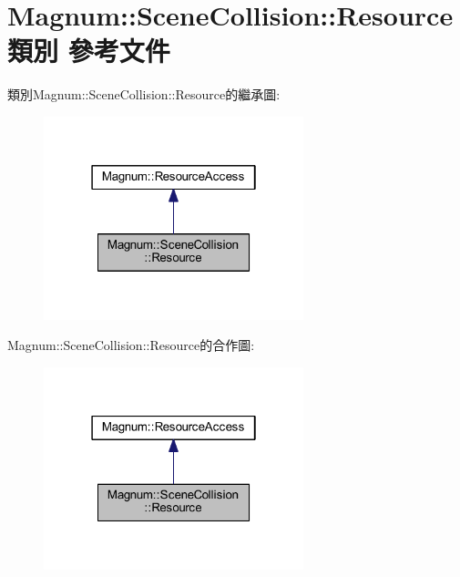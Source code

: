 \hypertarget{class_magnum_1_1_scene_collision_1_1_resource}{}\section{Magnum\+:\+:Scene\+Collision\+:\+:Resource 類別 參考文件}
\label{class_magnum_1_1_scene_collision_1_1_resource}


類別\+Magnum\+:\+:Scene\+Collision\+:\+:Resource的繼承圖\+:\nopagebreak
\begin{figure}[H]
\begin{center}
\leavevmode
\includegraphics[width=214pt]{class_magnum_1_1_scene_collision_1_1_resource__inherit__graph}
\end{center}
\end{figure}


Magnum\+:\+:Scene\+Collision\+:\+:Resource的合作圖\+:\nopagebreak
\begin{figure}[H]
\begin{center}
\leavevmode
\includegraphics[width=214pt]{class_magnum_1_1_scene_collision_1_1_resource__coll__graph}
\end{center}
\end{figure}
